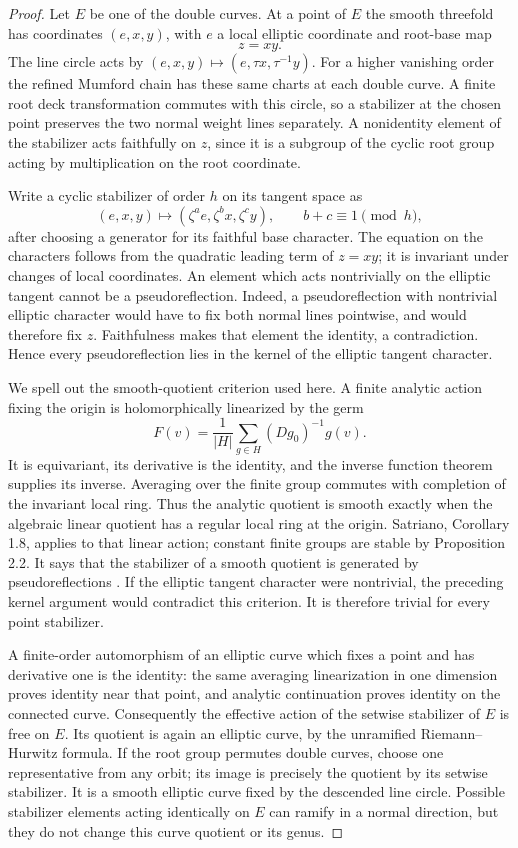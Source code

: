 \begin{proof}
Let \(E\) be one of the double curves.  At a point of
\(E\) the smooth threefold has coordinates \((e,x,y)\), with
\(e\) a local elliptic coordinate and root-base map
\[
                         z=xy.
\]
The line circle acts by \((e,x,y)\mapsto(e,\tau x,\tau^{-1}y)\).
For a higher vanishing order the refined Mumford chain has these
same charts at each double curve.  A finite root deck transformation
commutes with this circle, so a stabilizer at the chosen point
preserves the two normal weight lines separately.  A nonidentity
element of the stabilizer acts faithfully on \(z\), since it is
a subgroup of the cyclic root group acting by multiplication on
the root coordinate.

Write a cyclic stabilizer of order \(h\) on its tangent space as
\[
 (e,x,y)\longmapsto
 (\zeta^{a}e,\zeta^{b}x,\zeta^{c}y),
 \qquad b+c\equiv1\pmod h,
\]
after choosing a generator for its faithful base character.  The
equation on the characters follows from the quadratic leading term
of \(z=xy\); it is invariant under changes of local coordinates.
An element which acts nontrivially on the elliptic tangent cannot
be a pseudoreflection.  Indeed, a pseudoreflection with nontrivial
elliptic character would have to fix both normal lines pointwise,
and would therefore fix \(z\).  Faithfulness makes that element
the identity, a contradiction.  Hence every pseudoreflection lies
in the kernel of the elliptic tangent character.

We spell out the smooth-quotient criterion used here.  A finite
analytic action fixing the origin is holomorphically linearized by
the germ
\[
 F(v)=\frac1{|H|}\sum_{g\in H}(Dg_0)^{-1}g(v).
\]
It is equivariant, its derivative is the identity, and the inverse
function theorem supplies its inverse.  Averaging over the finite
group commutes with completion of the invariant local ring.  Thus
the analytic quotient is smooth exactly when the algebraic linear
quotient has a regular local ring at the origin.  Satriano,
Corollary 1.8, applies to that linear action; constant finite
groups are stable by Proposition 2.2.  It says that the stabilizer
of a smooth quotient is generated by pseudoreflections
\cite[Corollary 1.8 and Proposition 2.2]{Satriano2012}.
If the elliptic tangent character were nontrivial, the preceding
kernel argument would contradict this criterion.  It is therefore
trivial for every point stabilizer.

A finite-order automorphism of an elliptic curve which fixes a
point and has derivative one is the identity: the same averaging
linearization in one dimension proves identity near that point,
and analytic continuation proves identity on the connected curve.
Consequently the effective action of the setwise stabilizer of
\(E\) is free on \(E\).  Its quotient is again an elliptic
curve, by the unramified Riemann--Hurwitz formula.  If the root group
permutes double curves, choose one representative from any orbit;
its image is precisely the quotient by its setwise stabilizer.
It is a smooth elliptic curve fixed by the descended line circle.
Possible stabilizer elements acting identically on \(E\) can
ramify in a normal direction, but they do not change this curve
quotient or its genus.


\end{proof}

